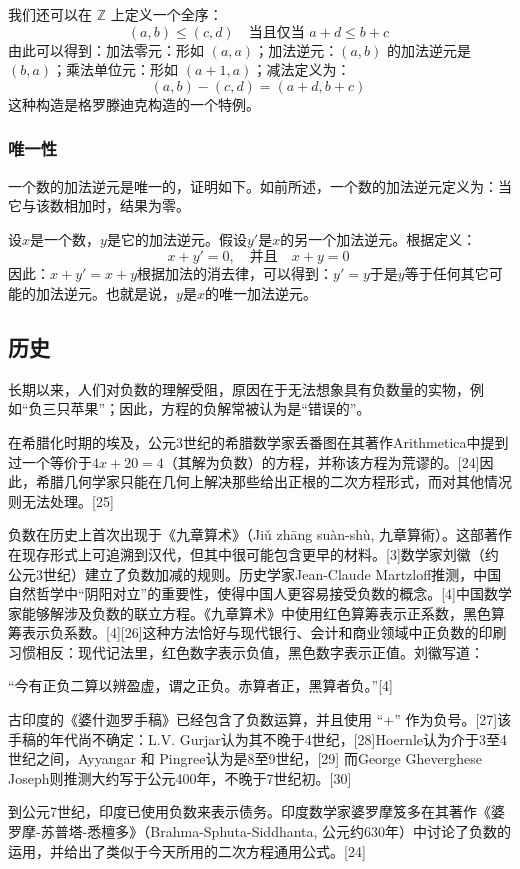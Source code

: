 我们还可以在 $\mathbb{Z}$ 上定义一个全序：
$$
(a, b) \leq (c, d) \quad \text{当且仅当 } a + d \leq b + c~
$$
由此可以得到：加法零元：形如 $(a, a)$；加法逆元：$(a, b)$ 的加法逆元是 $(b, a)$；乘法单位元：形如 $(a+1, a)$；减法定义为：
  $$
  (a, b) - (c, d) = (a + d, b + c)~
  $$
这种构造是格罗滕迪克构造的一个特例。
\subsubsection{唯一性}
一个数的加法逆元是唯一的，证明如下。如前所述，一个数的加法逆元定义为：当它与该数相加时，结果为零。

设$x$是一个数，$y$是它的加法逆元。假设$y'$是$x$的另一个加法逆元。根据定义：
$$
x + y' = 0, \quad \text{并且} \quad x + y = 0~
$$
因此：$x + y' = x + y$根据加法的消去律，可以得到：$y' = y$于是$y$等于任何其它可能的加法逆元。也就是说，$y$是$x$的唯一加法逆元。
\subsection{历史}
长期以来，人们对负数的理解受阻，原因在于无法想象具有负数量的实物，例如“负三只苹果”；因此，方程的负解常被认为是“错误的”。

在希腊化时期的埃及，公元3世纪的希腊数学家丢番图在其著作Arithmetica中提到过一个等价于$4x + 20 = 4$（其解为负数）的方程，并称该方程为荒谬的。[24]因此，希腊几何学家只能在几何上解决那些给出正根的二次方程形式，而对其他情况则无法处理。[25]

负数在历史上首次出现于《九章算术》（Jiǔ zhāng suàn-shù, 九章算術）。这部著作在现存形式上可追溯到汉代，但其中很可能包含更早的材料。[3]数学家刘徽（约公元3世纪）建立了负数加减的规则。历史学家Jean-Claude Martzloff推测，中国自然哲学中“阴阳对立”的重要性，使得中国人更容易接受负数的概念。[4]中国数学家能够解涉及负数的联立方程。《九章算术》中使用红色算筹表示正系数，黑色算筹表示负系数。[4][26]这种方法恰好与现代银行、会计和商业领域中正负数的印刷习惯相反：现代记法里，红色数字表示负值，黑色数字表示正值。刘徽写道：

“今有正负二算以辨盈虚，谓之正负。赤算者正，黑算者负。”[4]

古印度的《婆什迦罗手稿》已经包含了负数运算，并且使用 “+” 作为负号。[27]该手稿的年代尚不确定：L.V. Gurjar认为其不晚于4世纪，[28]Hoernle认为介于3至4世纪之间，Ayyangar 和 Pingree认为是8至9世纪，[29] 而George Gheverghese Joseph则推测大约写于公元400年，不晚于7世纪初。[30]

到公元7世纪，印度已使用负数来表示债务。印度数学家婆罗摩笈多在其著作《婆罗摩-苏普塔-悉檀多》（Brahma-Sphuta-Siddhanta, 公元约630年）中讨论了负数的运用，并给出了类似于今天所用的二次方程通用公式。[24]

